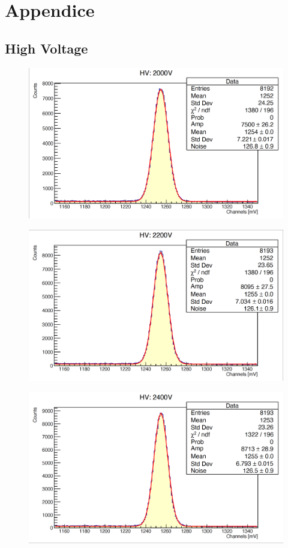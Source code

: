\documentclass[a4paper,10pt]{article}
\begin{document}

\section{Appendice}
\subsection{High Voltage}
\begin{figure}[H]
    \centering
    \includegraphics[scale=0.45]{appendice/2000}
\end{figure}
\begin{figure}[H]
    \centering
    \includegraphics[scale=0.45]{appendice/2200}
\end{figure}
\begin{figure}[H]
    \centering
    \includegraphics[scale=0.45]{appendice/2400}
\end{figure}
\end{document}
